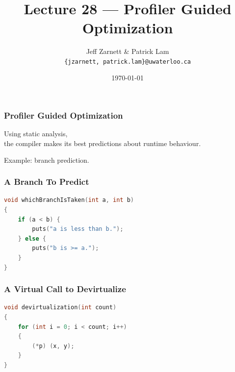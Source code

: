 

\title{Lecture 28 --- Profiler Guided Optimization }

\author{Jeff Zarnett \& Patrick Lam \\ \small \texttt{\{jzarnett, patrick.lam\}@uwaterloo.ca}}
\date{\today}




\begin{frame}
  \titlepage

 \end{frame}

\begin{frame}
\frametitle{Profiler Guided Optimization}

\Large
\begin{changemargin}{2cm}

Using static analysis, \\
the compiler makes its best predictions about runtime behaviour.

Example: branch prediction. 
\end{changemargin}

\end{frame}



\begin{frame}[fragile]
\frametitle{A Branch To Predict}
\begin{changemargin}{1.5cm}
\begin{lstlisting}[language=C,basicstyle=\large]
void whichBranchIsTaken(int a, int b)
{
    if (a < b) {
        puts("a is less than b.");
    } else {
        puts("b is >= a.");
    }
}
\end{lstlisting}
\end{changemargin}
\end{frame}

\begin{frame}[fragile]
\frametitle{A Virtual Call to Devirtualize}

\begin{changemargin}{2cm}
\begin{lstlisting}[language=C,basicstyle=\large]
void devirtualization(int count)
{
    for (int i = 0; i < count; i++)
    {
        (*p) (x, y);
    }
}
\end{lstlisting}
\end{changemargin}
\end{frame}

